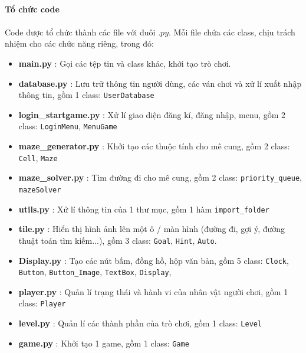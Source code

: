 \paragraph{Tổ chức code}
\paragraph{}{Code được tổ chức thành các file với đuôi $.py$. Mỗi file chứa các class, chịu trách nhiệm cho các chức năng riêng, trong đó:}
\begin{itemize}
    \item \textbf{main.py} : Gọi các tệp tin và class khác, khởi tạo trò chơi.

    \item \textbf{database.py} : Lưu trữ thông tin người dùng, các ván chơi và xử lí xuất nhập thông tin, gồm 1 class: \texttt{UserDatabase}

    \item \textbf{login\_startgame.py} : Xử lí giao diện đăng kí, đăng nhập, menu, gồm 2 class: \texttt{LoginMenu}, \texttt{MenuGame}

    \item \textbf{maze\_generator.py} : Khởi tạo các thuộc tính cho mê cung, gồm 2 class: \texttt{Cell}, \texttt{Maze}

    \item \textbf{maze\_solver.py} : Tìm đường đi cho mê cung, gồm 2 class: \texttt{priority\_queue}, \texttt{mazeSolver}

    \item \textbf{utils.py} : Xử lí thông tin của 1 thư mục, gồm 1 hàm \texttt{import\_folder}

    \item \textbf{tile.py} : Hiển thị hình ảnh lên một ô / màn hình (đường đi, gợi ý, đường thuật toán tìm kiếm...), gồm 3 class: \texttt{Goal}, \texttt{Hint}, \texttt{Auto}.

    \item \textbf{Display.py} : Tạo các nút bấm, đồng hồ, hộp văn bản, gồm 5 class: \texttt{Clock}, \texttt{Button}, \texttt{Button\_Image}, \texttt{TextBox}, \texttt{Display},

    \item \textbf{player.py} : Quản lí trạng thái và hành vi của nhân vật người chơi, gồm 1 class: \texttt{Player}
    
    \item \textbf{level.py} : Quản lí các thành phần của trò chơi, gồm 1 class: \texttt{Level}

    \item \textbf{game.py} : Khởi tạo 1 game, gồm 1 class: \texttt{Game}
    
\end{itemize}

